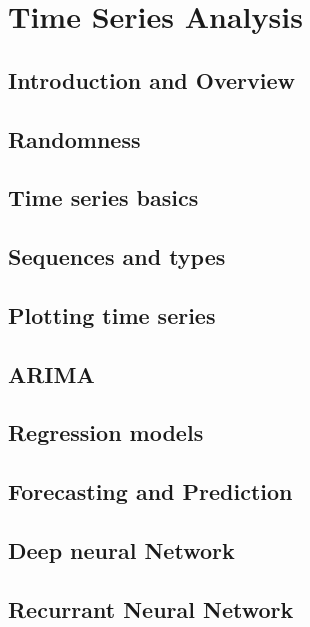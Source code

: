 \documentclass[11pt,fleqn]{book} %
\begin{document}
\part{Time Series Analysis}


\chapter{Introduction and Overview}
\chapter{Randomness}
\chapter{Time series basics}
\chapter{Sequences and types}
\chapter{Plotting time series}
\chapter{ARIMA}
\chapter{Regression models}
\chapter{Forecasting and Prediction}
\chapter{Deep neural Network}
\chapter{Recurrant Neural Network}
\end{document}
